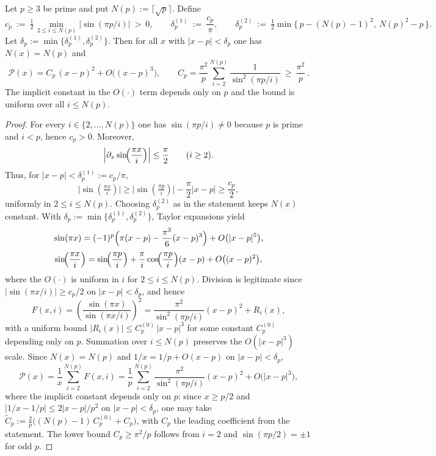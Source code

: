 \begin{lemma}\label{lem:local-quadratic}
Let $p\ge 3$ be prime and put $N(p):=\lceil \sqrt{p}\rceil$. Define
\[
c_p\ :=\ \tfrac12\min_{\,2\le i\le N(p)}\bigl|\sin(\pi p/i)\bigr|\ >\ 0,
\qquad
\delta_p^{(1)}\ :=\ \frac{c_p}{\pi},
\qquad
\delta_p^{(2)}\ :=\ \tfrac12\min\bigl\{\,p-(N(p)-1)^2,\ N(p)^2-p\,\bigr\}.
\]
Let $\delta_p:=\min\{\delta_p^{(1)},\delta_p^{(2)}\}$. Then for all $x$ with $|x-p|<\delta_p$ one has $N(x)=N(p)$ and
\[
\mathcal P(x)=C_p\,(x-p)^2+O\bigl((x-p)^3\bigr),
\qquad
C_p=\frac{\pi^2}{p}\sum_{i=2}^{N(p)}\frac{1}{\sin^2(\pi p/i)}\ \ge\ \frac{\pi^2}{p}\,.
\]
The implicit constant in the $O(\cdot)$ term depends only on $p$ and the bound is uniform over all $i\le N(p)$.

\begin{proof}
For every $i\in\{2,\dots,N(p)\}$ one has $\sin(\pi p/i)\neq 0$ because $p$ is prime and $i<p$, hence $c_p>0$. Moreover,
\[
\Bigl|\partial_x \sin\!\Bigl(\frac{\pi x}{i}\Bigr)\Bigr|\le \frac{\pi}{2}\qquad(i\ge 2).
\]
Thus, for $|x-p|<\delta_p^{(1)}:=c_p/\pi$,
\[
\bigl|\sin(\tfrac{\pi x}{i})\bigr|\ge \bigl|\sin(\tfrac{\pi p}{i})\bigr|-\frac{\pi}{2}|x-p|\ge \frac{c_p}{2},
\]
uniformly in $2\le i\le N(p)$. Choosing $\delta_p^{(2)}$ as in the statement keeps $N(x)$ constant. With $\delta_p:=\min\{\delta_p^{(1)},\delta_p^{(2)}\}$, Taylor expansions yield
\[
\sin(\pi x)=(-1)^p\Bigl(\pi(x-p)-\frac{\pi^3}{6}(x-p)^3\Bigr)+O\bigl(|x-p|^5\bigr),
\]
\[
\sin\!\Bigl(\frac{\pi x}{i}\Bigr)=\sin\!\Bigl(\frac{\pi p}{i}\Bigr)+\frac{\pi}{i}\cos\!\Bigl(\frac{\pi p}{i}\Bigr)(x-p)+O\bigl((x-p)^2\bigr),
\]
where the $O(\cdot)$ is uniform in $i$ for $2\le i\le N(p)$. Division is legitimate since $|\sin(\pi x/i)|\ge c_p/2$ on $|x-p|<\delta_p$, and hence
\[
F(x,i)=\left(\frac{\sin(\pi x)}{\sin(\pi x/i)}\right)^{\!2}
=\frac{\pi^2}{\sin^2(\pi p/i)}(x-p)^2+R_i(x),
\]
with a uniform bound $|R_i(x)|\le C_p^{(0)}\,|x-p|^3$ for some constant $C_p^{(0)}$ depending only on $p$. Summation over $i\le N(p)$ preserves the $O(|x-p|^3)$ scale. Since $N(x)=N(p)$ and $1/x=1/p+O(x-p)$ on $|x-p|<\delta_p$,
\[
\mathcal P(x)=\frac{1}{x}\sum_{i=2}^{N(p)}F(x,i)
=\frac{1}{p}\sum_{i=2}^{N(p)}\frac{\pi^2}{\sin^2(\pi p/i)}(x-p)^2+O\bigl(|x-p|^3\bigr),
\]
where the implicit constant depends only on $p$: since $x\ge p/2$ and $|1/x-1/p|\le 2|x-p|/p^2$ on $|x-p|<\delta_p$, one may take $\widetilde C_p:=\tfrac{2}{p}\bigl((N(p)-1)\,C_p^{(0)}+C_p\bigr)$, with $C_p$ the leading coefficient from the statement. The lower bound $C_p\ge \pi^2/p$ follows from $i=2$ and $\sin(\pi p/2)=\pm 1$ for odd $p$.
\end{proof}
\end{lemma}


